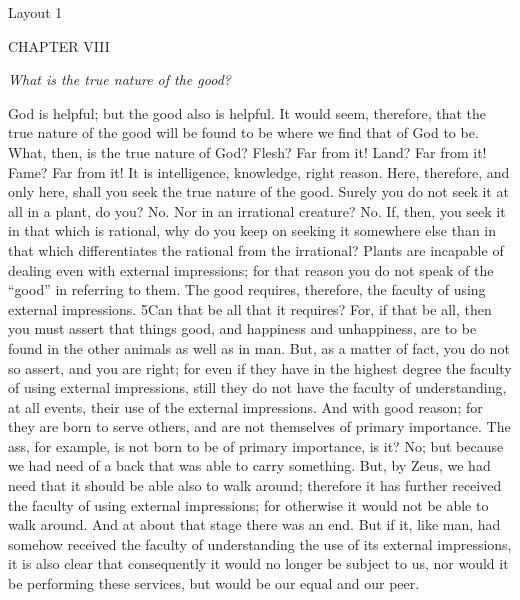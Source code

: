 

Layout 1

CHAPTER VIII

\emph{What is the true nature of the good?}

God is helpful; but the good also is helpful. It would seem, therefore, that the true nature of the good will be found to be where we find that of God to be. What, then, is the true nature of God? Flesh? Far from it! Land? Far from it! Fame? Far from it! It is intelligence, knowledge, right reason. Here, therefore, and only here, shall you seek the true nature of the good. Surely you do not seek it at all in a plant, do you? No. Nor in an irrational creature? No. If, then, you seek it in that which is rational, why do you keep on seeking it somewhere else than in that which differentiates the rational from the irrational? Plants are incapable of dealing even with external impressions; for that reason you do not speak of the ``good'' in referring to them. The good requires, therefore, the faculty of using external impressions. 5Can that be all that it requires? For, if that be all, then you must assert that things good, and happiness and unhappiness, are to be found in the other animals as well as in man. But, as a matter of fact, you do not so assert, and you are right; for even if they have in the highest degree the faculty of using external impressions, still they do not have the faculty of understanding, at all events, their use of the external impressions. And with good reason; for they are born to serve others, and are not themselves of primary importance. The ass, for example, is not born to be of primary importance, is it? No; but because we had need of a back that was able to carry something. But, by Zeus, we had need that it should be able also to walk around; therefore it has further received the faculty of using external impressions; for otherwise it would not be able to walk around. And at about that stage there was an end. But if it, like man, had somehow received the faculty of understanding the use of its external impressions, it is also clear that consequently it would no longer be subject to us, nor would it be performing these services, but would be our equal and our peer.

